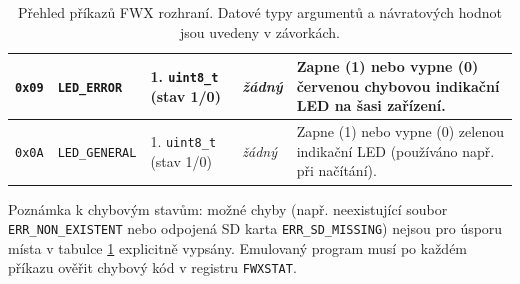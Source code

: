 \begin{table}[htbp]
{\begin{tabular}{c l p{3.5cm} p{2cm} p{5.5cm}}
        \midrule
        \texttt{0x09} & \texttt{LED\_ERROR} & 1. \texttt{uint8\_t} (stav 1/0) & \textit{žádný} &
        Zapne (1) nebo vypne (0) červenou chybovou indikační LED na šasi zařízení. \\
        \midrule
        \texttt{0x0A} & \texttt{LED\_GENERAL} & 1. \texttt{uint8\_t} (stav 1/0) & \textit{žádný} &
        Zapne (1) nebo vypne (0) zelenou indikační LED (používáno např. při načítání). \\
        \bottomrule
    \end{tabular}
    }
    \caption{Přehled příkazů FWX rozhraní. Datové typy argumentů a návratových hodnot jsou uvedeny v
    závorkách.}
    \label{tab:fwx_cmds}
\end{table}

Poznámka k chybovým stavům: možné chyby (např. neexistující soubor \texttt{ERR\_NON\_EXISTENT} nebo
odpojená SD karta \texttt{ERR\_SD\_MISSING}) nejsou pro úsporu místa v tabulce \ref{tab:fwx_cmds}
explicitně vypsány. Emulovaný program musí po každém příkazu ověřit chybový kód v registru
\texttt{FWXSTAT}.
